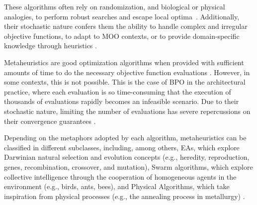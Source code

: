	These algorithms often rely on randomization, and biological or physical analogies, to perform robust searches and escape local optima~\cite{Glover2003Metaheuristics}. Additionally, their stochastic nature confers them the ability to handle complex and irregular objective functions, to adapt to \ac{MOO} contexts, or to provide domain-specific knowledge through heuristics \cite{Wortmann2017GABESTCHOICE}.
	
	Metaheuristics are good optimization algorithms when provided with sufficient amounts of time to do the necessary objective function evaluations \cite{Conn2009}. However, in some contexts, this is not possible. This is the case of \ac{BPO} in the architectural practice, where each evaluation is so time-consuming that the execution of thousands of evaluations rapidly becomes an infeasible scenario. Due to their stochastic nature, limiting the number of evaluations has severe repercussions on their convergence guarantees \cite{Hasancebi2009}.
	
	Depending on the metaphors adopted by each algorithm, metaheuristics can be classified in different subclasses, including, among others, \acp{EA}, which explore Darwinian natural selection and evolution concepts (e.g., heredity, reproduction, genes, recombination, crossover, and mutation), Swarm algorithms, which explore collective intelligence through the cooperation of homogeneous agents in the environment (e.g., birds, ants, bees), and Physical Algorithms, which take inspiration from physical processes (e.g., the annealing process in metallurgy) \cite{Brownlee2011}.
	
